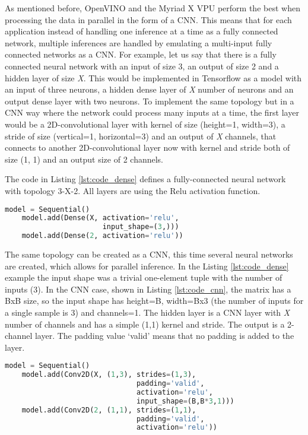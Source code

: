 As mentioned before, OpenVINO and the Myriad X VPU perform the best when processing the data in parallel in the form of a CNN. This means that for each application instead of handling one inference at a time as a fully connected network, multiple inferences are handled by emulating a multi-input fully connected networks as a CNN. For example, let us say that there is a fully connected neural network with an input of size 3, an output of size 2 and a hidden layer of size \textit{X}. This would be implemented in Tensorflow as a model with an input of three neurons, a hidden dense layer of \textit{X} number of neurons and an output dense layer with two neurons. To implement the same topology but in a CNN way where the network could process many inputs at a time, the first layer would be a 2D-convolutional layer with kernel of size (height=1, width=3), a stride of size (vertical=1, horizontal=3) and an output of \textit{X} channels, that connects to another 2D-convolutional layer now with kernel and stride both of size (1, 1) and an output size of 2 channels.

The code in Listing \ref{lst:code_dense} defines a fully-connected neural network with topology 3-X-2. All layers are using the Relu activation function.

\begin{minipage}{\linewidth}
\begin{lstlisting}[frame=single, tabsize=4, caption={Tensorflow example model using dense layers.},label={lst:code_dense},language=Python,captionpos=b]
	model = Sequential()
	model.add(Dense(X, activation='relu',
	                   input_shape=(3,)))
	model.add(Dense(2, activation='relu'))
\end{lstlisting}
\end{minipage}

The same topology can be created as a CNN, this time several neural networks are created, which allows for parallel inference. In the Listing \ref{lst:code_dense} example the input shape was a trivial one-element tuple with the number of inputs (3). In the CNN case, shown in Listing \ref{lst:code_cnn}, the matrix has a BxB size, so the input shape has height=B, width=Bx3 (the number of inputs for a single sample is 3) and channels=1. The hidden layer is a CNN layer with \textit{X} number of channels and has a simple (1,1) kernel and stride. The output is a 2-channel layer. The padding value `valid' means that no padding is added to the layer.

\begin{minipage}{\linewidth}
\begin{lstlisting}[frame=single, tabsize=4, caption={Tensorflow example model using convolutional layers.},label={lst:code_cnn},language=Python,captionpos=b]
	model = Sequential()
	model.add(Conv2D(X, (1,3), strides=(1,3),
	                           padding='valid',
	                           activation='relu',
	                           input_shape=(B,B*3,1)))
	model.add(Conv2D(2, (1,1), strides=(1,1),
	                           padding='valid',
	                           activation='relu'))
\end{lstlisting}
\end{minipage}

